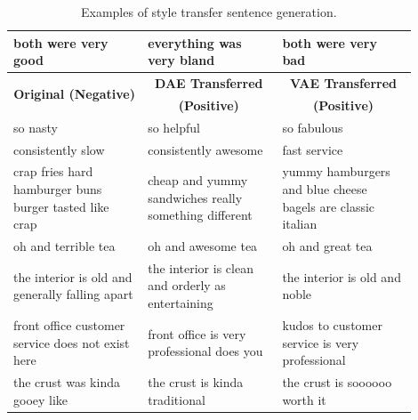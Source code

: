 \documentclass[letterpaper]{article} %
\newcommand{\tabh}[1]{\multicolumn{1}{c|}{\textbf{#1}}}
\newcommand{\tabc}[2]{\multicolumn{1}{|c||}{\multirow{#1}{*}{\textbf{#2}}}}
\begin{document}
\begin{table}[ht]
\begin{tabular}{| p{0.3\linewidth} || p{0.3\linewidth} | p{0.3\linewidth} |}
		\hline
		both were very good                                    & everything was very bland                                      & both were very bad                                          \\
		\hline
		\hline
		\hline
		\tabc{2}{Original (Negative)}                          & \tabh{DAE Transferred}                                         & \tabh{VAE Transferred}                                      \\
		                                                       & \tabh{(Positive)}                                              & \tabh{(Positive)}                                           \\
		\hline
		\hline
		so nasty                                               & so helpful                                                     & so fabulous                                                 \\
		\hline
		consistently slow                                      & consistently awesome                                           & fast service                                                \\
		\hline
		crap fries hard hamburger buns burger tasted like crap & cheap and yummy sandwiches really something different          & yummy hamburgers and blue cheese bagels are classic italian \\
		\hline
		oh and terrible tea                                    & oh and awesome tea                                             & oh and great tea                                            \\
		\hline
		the interior is old and generally falling apart        & the interior is clean and orderly as entertaining              & the interior is old and noble                               \\
		\hline
		front office customer service does not exist here      & front office is very professional does you                     & kudos to customer service is very professional              \\
		\hline
		the crust was kinda gooey like                         & the crust is kinda traditional                                 & the crust is soooooo worth it                               \\
		\hline
	\end{tabular}
	\caption{Examples of style transfer sentence generation.}
	\label{tab:transfer-samples}
\end{table}
\end{document}
